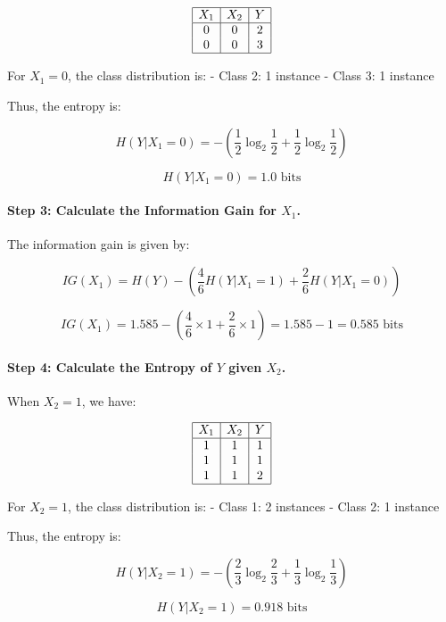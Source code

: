\documentclass[12pt]{article}
\begin{document}
\[
  \begin{array}{|c|c|c|}
    \hline
    X_1 & X_2 & Y \\
    \hline
    0   & 0   & 2 \\
    0   & 0   & 3 \\
    \hline
  \end{array}
\]

For $X_1 = 0$, the class distribution is:
- Class 2: 1 instance
- Class 3: 1 instance

Thus, the entropy is:

\[
  H(Y|X_1 = 0) = -\left( \frac{1}{2} \log_2 \frac{1}{2} + \frac{1}{2} \log_2 \frac{1}{2} \right)
\]

\[
  H(Y|X_1 = 0) = 1.0 \text{ bits}
\]

\paragraph{Step 3: Calculate the Information Gain for $X_1$.}

The information gain is given by:

\[
  IG(X_1) = H(Y) - \left( \frac{4}{6} H(Y|X_1 = 1) + \frac{2}{6} H(Y|X_1 = 0) \right)
\]

\[
  IG(X_1) = 1.585 - \left( \frac{4}{6} \times 1 + \frac{2}{6} \times 1 \right) = 1.585 - 1 = 0.585 \text{ bits}
\]

\paragraph{Step 4: Calculate the Entropy of $Y$ given $X_2$.}

When $X_2 = 1$, we have:

\[
  \begin{array}{|c|c|c|}
    \hline
    X_1 & X_2 & Y \\
    \hline
    1   & 1   & 1 \\
    1   & 1   & 1 \\
    1   & 1   & 2 \\
    \hline
  \end{array}
\]

For $X_2 = 1$, the class distribution is:
- Class 1: 2 instances
- Class 2: 1 instance

Thus, the entropy is:

\[
  H(Y|X_2 = 1) = -\left( \frac{2}{3} \log_2 \frac{2}{3} + \frac{1}{3} \log_2 \frac{1}{3} \right)
\]

\[
  H(Y|X_2 = 1) = 0.918 \text{ bits}
\]
\end{document}
